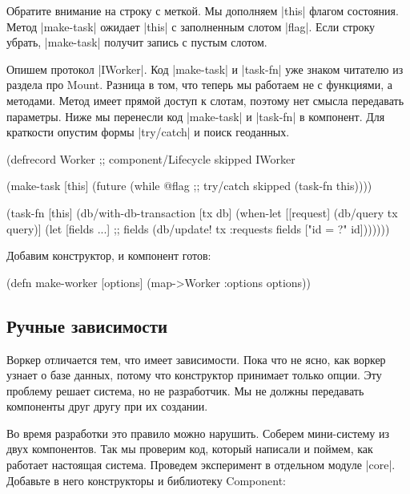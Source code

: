 Обратите внимание на строку с меткой. Мы дополняем \spverb|this| флагом
состояния. Метод \spverb|make-task| ожидает \spverb|this| с заполненным слотом
\spverb|flag|. Если строку убрать, \spverb|make-task| получит запись с пустым
слотом.

Опишем протокол \spverb|IWorker|. Код \spverb|make-task| и \spverb|task-fn| уже
знаком читателю из раздела про Mount. Разница в том, что теперь мы
работаем не с функциями, а методами. Метод имеет прямой доступ к слотам, поэтому
нет смысла передавать параметры. Ниже мы перенесли код \spverb|make-task| и
\spverb|task-fn| в компонент. Для краткости опустим формы \spverb|try/catch| и
поиск геоданных.

\begin{english}
  \begin{clojure}
(defrecord Worker
  ;; component/Lifecycle skipped
  IWorker

  (make-task [this]
    (future
      (while @flag ;; try/catch skipped
        (task-fn this))))

  (task-fn [this]
    (db/with-db-transaction [tx db]
      (when-let [[request] (db/query tx query)]
        (let [fields ...] ;; fields
          (db/update! tx :requests
                      fields ["id = ?" id]))))))
  \end{clojure}
\end{english}

Добавим конструктор, и компонент готов:

\begin{english}
  \begin{clojure}
(defn make-worker
  [options]
  (map->Worker {:options options}))
  \end{clojure}
\end{english}

\subsection{Ручные зависимости}

Воркер отличается тем, что имеет зависимости. Пока что не ясно, как воркер
узнает о базе данных, потому что конструктор принимает только опции. Эту
проблему решает система, но не разработчик. Мы не должны передавать компоненты
друг другу при их создании.

Во время разработки это правило можно нарушить. Соберем мини-систему из двух
компонентов. Так мы проверим код, который написали и поймем, как работает
настоящая система. Проведем эксперимент в отдельном модуле
\spverb|core|. Добавьте в него конструкторы и библиотеку Component:


